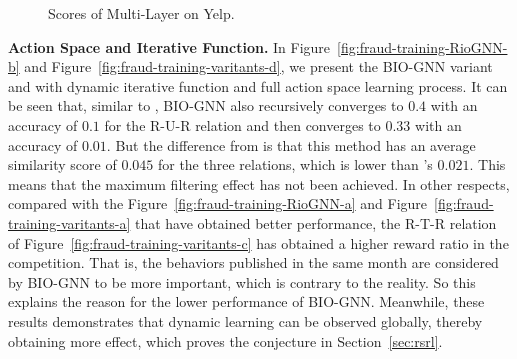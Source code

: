 \begin{comment}
\begin{figure}[h]
  \centering
  \texttt{[image: fig/scores\_yelp\_2layer.pdf]}
  \caption{Scores of Multi-Layer Rio-GNN on Yelp.}
  \label{fig:fraud-2layer-scores}
\end{figure}
\end{comment}


\begin{figure}[t]
\centering
{}\centering
\caption{Scores of Multi-Layer \RioGNN on Yelp.}\label{fig:fraud-2layer-scores}
\end{figure}


\textbf{Action Space and Iterative Function. }
In Figure~\ref{fig:fraud-training-RioGNN-b} and Figure~\ref{fig:fraud-training-varitants-d}, we present the BIO-GNN variant and \RioGNN with dynamic iterative function and full action space learning process.
It can be seen that, similar to \RioGNN, BIO-GNN also recursively converges to $0.4$ with an accuracy of $0.1$ for the R-U-R relation and then converges to $0.33$ with an accuracy of $0.01$.
But the difference from \RioGNN is that this method has an average similarity score of $0.045$ for the three relations, which is lower than \RioGNN's $0.021$.
This means that the maximum filtering effect has not been achieved. 
In other respects, compared with the Figure~\ref{fig:fraud-training-RioGNN-a} and Figure~\ref{fig:fraud-training-varitants-a} that have obtained better performance, the R-T-R relation of Figure~\ref{fig:fraud-training-varitants-c} has obtained a higher reward ratio in the competition. That is, the behaviors published in the same month are considered by BIO-GNN to be more important, which is contrary to the reality. So this explains the reason for the lower performance of BIO-GNN.
Meanwhile, these results demonstrates that dynamic learning can be observed globally, thereby obtaining more effect, which proves the conjecture in Section~\ref{sec:rsrl}.






